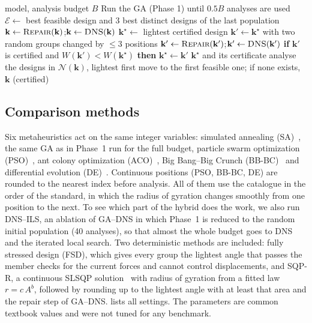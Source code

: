 \documentclass[lineno,pdflatex,sn-mathphys-num]{sn-jnl}
\begin{document}
\begin{algorithm}[tbp]
\caption{GA--DNS}
\label{alg:gadns}
\begin{algorithmic}[1]
\Require model, analysis budget $B$
\State Run the GA (Phase 1) until $0.5B$ analyses are used
\State $\mathcal E\leftarrow$ best feasible design and 3 best distinct designs of the last population
  \State $\mathbf{k}\leftarrow\textsc{Repair}(\mathbf{k})$;\quad $\mathbf{k}\leftarrow\textsc{DNS}(\mathbf{k})$
\EndFor
\State $\mathbf{k}^\star\leftarrow$ lightest certified design
  \State $\mathbf{k}'\leftarrow\mathbf{k}^\star$ with two random groups changed by $\le3$ positions
  \State $\mathbf{k}'\leftarrow\textsc{Repair}(\mathbf{k}')$;\quad $\mathbf{k}'\leftarrow\textsc{DNS}(\mathbf{k}')$
  \State \textbf{if} $\mathbf{k}'$ is certified and $W(\mathbf{k}')<W(\mathbf{k}^\star)$ \textbf{then} $\mathbf{k}^\star\leftarrow\mathbf{k}'$
\EndWhile
\State \Return $\mathbf{k}^\star$ and its certificate
\Statex
{}
  \Repeat
    \State analyse the designs in $\mathcal N(\mathbf{k})$, lightest first
    \State move to the first feasible one; if none exists, \Return $\mathbf{k}$ (certified)
\EndFunction
\end{algorithmic}
\end{algorithm}

\subsection{Comparison methods}
\label{sec:baselines}
Six metaheuristics act on the same integer variables: simulated annealing
(SA)~\citep{Kirkpatrick1983}, the same GA as in Phase~1 run for the full
budget, particle swarm optimization (PSO)~\citep{Kennedy1995,Perez2007}, ant
colony optimization (ACO)~\citep{Dorigo1997,Camp2004}, Big Bang--Big Crunch
(BB-BC)~\citep{Erol2006,Camp2007} and differential evolution
(DE)~\citep{Storn1997}. Continuous positions (PSO, BB-BC, DE) are rounded to
the nearest index before analysis. All of them use the catalogue in the order
of the standard, in which the radius of gyration changes smoothly from one
position to the next. To see which part of the hybrid does the work, we also
run DNS--ILS, an ablation of GA--DNS in which Phase~1 is reduced to the random
initial population (40 analyses), so that almost the whole budget goes to DNS
and the iterated local search. Two deterministic methods are included:
fully stressed design (FSD), which gives every group the lightest angle that
passes the member checks for the current forces and cannot control
displacements, and SQP-R, a continuous SLSQP solution~\citep{Virtanen2020} with
radius of gyration from a fitted law $r=c\,A^{b}$, followed by rounding up to
the lightest angle with at least that area and the repair step of GA--DNS.  lists all settings. The
parameters are common textbook values and were not tuned for any benchmark.
\end{document}
